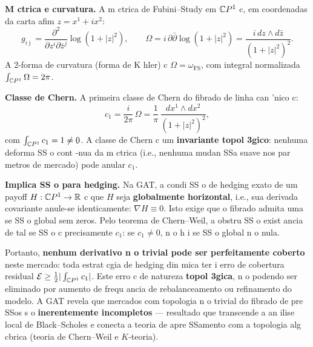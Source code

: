\begin{sol}
\textbf{M ctrica e curvatura.} A m ctrica de Fubini--Study em $\mathbb{C} P^1$ c, em coordenadas da carta afim $z = x^1 + ix^2$:
\begin{equation}
 g_{i\bar\jmath} = \frac{\partial^2}{\partial z^i\partial \bar z^j}\log(1+|z|^2),\qquad
 \Omega = i\,\partial\bar\partial\log(1+|z|^2) = \frac{i\,dz\wedge d\bar z}{(1+|z|^2)^2}.
\end{equation}
A 2-forma de curvatura (forma de K hler) c $\Omega = \omega_{\text{FS}}$, com integral normalizada $\int_{\mathbb{C} P^1}\Omega = 2\pi$.

\textbf{Classe de Chern.} A primeira classe de Chern do fibrado de linha can 'nico c:
\begin{equation}
 c_1 = \frac{i}{2\pi}\,\Omega = \frac{1}{\pi}\,\frac{dx^1\wedge dx^2}{(1+|z|^2)^2},
\end{equation}
com $\int_{\mathbb{C} P^1} c_1 = 1 \neq 0$. A classe de Chern c um \textbf{invariante topol 3gico}: nenhuma deforma SS o cont -nua da m ctrica (i.e., nenhuma mudan SSa suave nos par metros de mercado) pode anular $c_1$.

\textbf{Implica SS o para hedging.} Na GAT, a condi SS o de hedging exato de um payoff $H:\mathbb{C} P^1\to\mathbb{R}$ c que $H$ seja \textbf{globalmente horizontal}, i.e., sua derivada covariante anule-se identicamente: $\nabla H \equiv 0$. Isto exige que o fibrado admita uma se SS o global sem zeros. Pelo teorema de Chern--Weil, a obstru SS o exist ancia de tal se SS o c precisamente $c_1$: se $c_1\neq 0$, n o h i se SS o global n o nula.

Portanto, \textbf{nenhum derivativo n o trivial pode ser perfeitamente coberto} neste mercado: toda estrat cgia de hedging din mica ter i erro de cobertura residual $\mathcal{E}\geq \frac{1}{2}|\int_{\mathbb{C} P^1}c_1|$. Este erro c de natureza \textbf{topol 3gica}, n o podendo ser eliminado por aumento de frequ ancia de rebalanceamento ou refinamento do modelo. A GAT revela que mercados com topologia n o trivial do fibrado de pre SSos s o \textbf{inerentemente incompletos} --- resultado que transcende a an ilise local de Black--Scholes e conecta a teoria de apre SSamento com a topologia alg cbrica (teoria de Chern--Weil e $K$-teoria).
\end{sol}

\endinput



